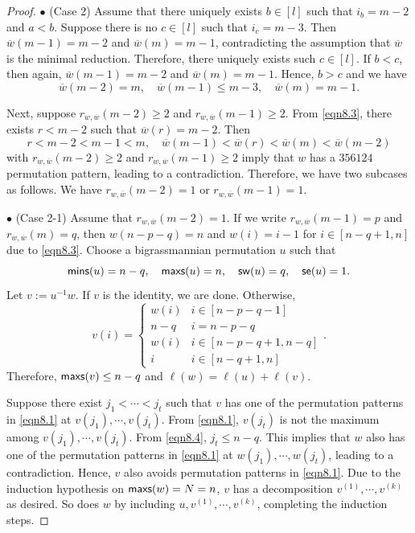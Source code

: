\documentclass[12pt]{amsart}
\theoremstyle{definition}
\theoremstyle{remark}
\begin{document}
\begin{proof}
$\bullet$ (Case 2) Assume that there uniquely exists $b \in [l]$ such that $i_b = m-2$ and $a < b$. Suppose there is no $c \in [l]$ such that $i_c = m-3$. Then $\overline{w} (m-1)= m-2$ and $\overline{w} (m) = m-1$, contradicting the assumption that $\overline{w}$ is the minimal reduction. Therefore, there uniquely exists such $c \in [l]$. If $b < c$, then again, $\overline{w} (m-1)= m-2$ and $\overline{w} (m) = m-1$. Hence, $b >c$ and we have
\begin{equation}\label{eqn8.3}
\overline{w}(m-2) = m , \quad \overline{w} (m-1 ) \leq m-3 , \quad \overline{w} (m) = m-1.
\end{equation}

Next, suppose $r_{w , \overline{w}} (m-2) \geq 2$ and $r_{w , \overline{w}} (m-1) \geq 2$. From \eqref{eqn8.3}, there exists $r < m-2$ such that $\overline{w} (r) = m-2$. Then
\begin{equation}
r < m-2 < m-1 < m , \quad \overline{w} (m-1) < \overline{w} (r) < \overline{w} (m) < \overline{w} (m-2)
\end{equation}
with $r_{w , \overline{w}} (m-2) \geq 2$ and $r_{w , \overline{w}} (m-1) \geq 2$ imply that $w$ has a $356124$ permutation pattern, leading to a contradiction. Therefore, we have two subcases as follows. We have $r_{w , \overline{w}} (m-2) = 1$ or $r_{w , \overline{w}} (m-1) = 1$.

$\bullet$ (Case 2-1) Assume that $r_{w , \overline{w}} (m-2) = 1$. If we write $r_{w , \overline{w}} (m-1) = p$ and $r_{w , \overline{w}} (m) = q$, then $w (n-p-q) = n$ and $w (i) = i-1$ for $i \in [n-q+1 , n]$ due to \eqref{eqn8.3}. Choose a bigrassmannian permutation $u$ such that
\begin{equation}
{\sf mins}(u) = n-q , \quad {\sf maxs}(u) = n , \quad {\sf sw}(u) = q, \quad {\sf se}(u) = 1.
\end{equation}
Let $v:= u^{-1} w$. If $v$ is the identity, we are done. Otherwise,
\begin{equation}\label{eqn8.4}
v (i) = 
\begin{cases}
w(i) & i \in [n-p-q-1] \\
n-q & i = n-p -q \\
w(i) & i \in [n-p -q +1 , n-q] \\
i & i \in [n-q +1 , n]
\end{cases}
.
\end{equation}
Therefore, ${\sf maxs} (v) \leq n-q$ and $\ell (w) = \ell (u) + \ell (v)$. 

Suppose there exist $j_1 < \cdots < j_t$ such that $v$ has one of the permutation patterns in \eqref{eqn8.1} at $v(j_1) , \cdots , v(j_t)$. From \eqref{eqn8.1}, $v(j_t)$ is not the maximum among $v(j_1) , \cdots , v(j_t)$. From \eqref{eqn8.4}, $j_t \leq n-q$. This implies that $w$ also has one of the permutation patterns in \eqref{eqn8.1} at $w(j_1) , \cdots , w(j_t)$, leading to a contradiction. Hence, $v$ also avoids permutation patterns in \eqref{eqn8.1}. Due to the induction hypothesis on ${\sf maxs}(w) = N = n$, $v$ has a decomposition $v^{(1)} , \cdots , v^{(k)}$ as desired. So does $w$ by including $u , v^{(1)} , \cdots , v^{(k)}$, completing the induction steps.


\end{proof}
\end{document}
